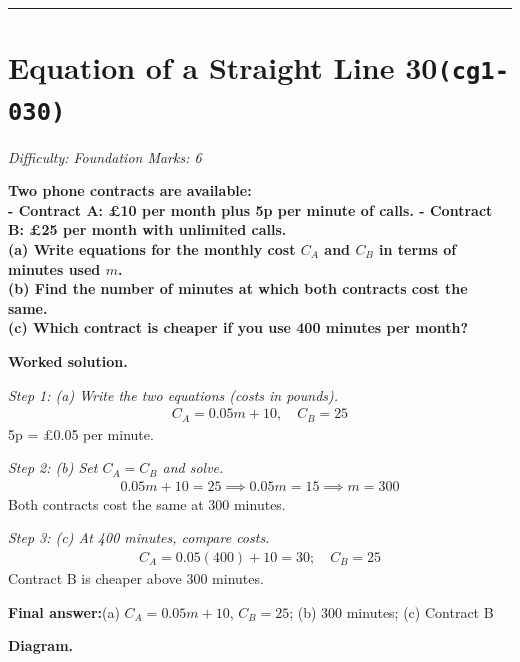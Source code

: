 \documentclass[11pt]{article}
\newcommand{\question}[1]{\par\medskip\noindent\textbf{#1}\par}
\begin{document}
\medskip\hrule

\section*{Equation of a Straight Line 30\quad\small\texttt{(cg1-030)}}
\textit{Difficulty: Foundation \quad\textbar\quad Marks: 6}

\question{Two phone contracts are available: \\[3pt] - Contract A: \pounds 10 per month plus 5p per minute of calls. - Contract B: \pounds 25 per month with unlimited calls. \\[3pt] (a) Write equations for the monthly cost \( C_A \) and \( C_B \) in terms of minutes used \( m \). \\[3pt] (b) Find the number of minutes at which both contracts cost the same. \\[3pt] (c) Which contract is cheaper if you use 400 minutes per month?}

\textbf{Worked solution.}

\textit{Step 1: (a) Write the two equations (costs in pounds).}
\[\begin{gathered}
C_A = 0.05m + 10, \quad C_B = 25
\end{gathered}\]
5p = \pounds 0.05 per minute.

\textit{Step 2: (b) Set \( C_A = C_B \) and solve.}
\[\begin{gathered}
0.05m + 10 = 25 \implies 0.05m = 15 \implies m = 300
\end{gathered}\]
Both contracts cost the same at 300 minutes.

\textit{Step 3: (c) At 400 minutes, compare costs.}
\[\begin{gathered}
C_A = 0.05(400) + 10 = 30; \quad C_B = 25
\end{gathered}\]
Contract B is cheaper above 300 minutes.

\begin{answerbox}
\textbf{Final answer:}\quad (a) \(\displaystyle C_A = 0.05m + 10\), \(\displaystyle C_B = 25\); (b) 300 minutes; (c) Contract B
\end{answerbox}
\textbf{Diagram.}
\end{document}
